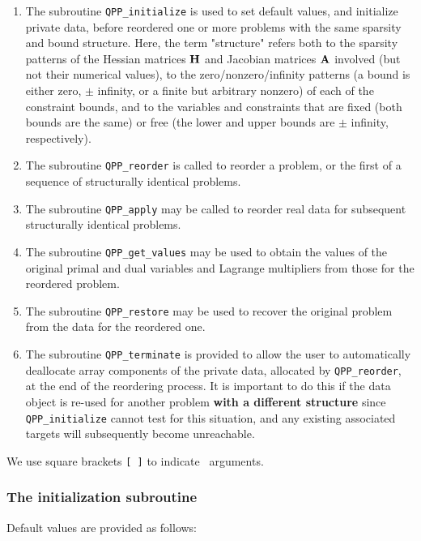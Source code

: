 \documentclass{galahad}
\newcommand{\packagename}{QPP}
\begin{document}
\begin{enumerate}
\item The subroutine 
  {\tt \packagename\_initialize} 
  is used to set default 
  values, and initialize private data, before reordered one or more problems 
  with the same sparsity and bound structure. 
  Here, the term "structure" refers both to 
  the sparsity patterns of the Hessian matrices ${\mathbf{H}}$ and Jacobian 
  matrices ${\mathbf{A}}$ involved 
  (but not their numerical values), to the zero/nonzero/infinity patterns 
  (a bound is either zero, $\pm$ infinity, or a finite but arbitrary 
  nonzero) of each of the constraint bounds, and to the variables and 
  constraints that are fixed (both bounds are the same) or free 
  (the lower and upper bounds are $\pm$ infinity, respectively). 
 
\item The subroutine 
  {\tt \packagename\_reorder} 
  is called to reorder a problem, or the first of a sequence of structurally 
  identical problems. 
 
\item The subroutine 
  {\tt \packagename\_apply} 
  may be called to reorder real data for subsequent structurally identical 
  problems. 
 
\item The subroutine 
  {\tt \packagename\_get\_values} 
  may be used to obtain the values of the original primal and dual variables 
  and Lagrange multipliers from those for the reordered problem. 
 
\item The subroutine {\tt \packagename\_restore} may be used to recover the 
  original problem from the data for the reordered one. 
 
\item The subroutine 
  {\tt \packagename\_terminate} 
  is provided to allow the user to automatically deallocate array components 
  of the private data,  allocated by 
  {\tt \packagename\_reorder}, 
  at the end of the reordering process. It is important to do this if the data 
  object is re-used for another problem {\bf with a different structure} 
  since {\tt \packagename\_initialize} cannot test for this situation, 
  and any existing associated targets will subsequently become unreachable. 
\end{enumerate}
We use square brackets {\tt [ ]} to indicate \optional\ arguments.


\subsubsection{The initialization subroutine}\label{subinit}
 Default values are provided as follows:
\vspace*{1mm}
\end{document}
